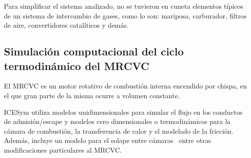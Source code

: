 Para simplificar el sistema analizado, no se tuvieron en cuneta elementos
típicos de un sistema de intercambio de gases, como lo son: mariposa,
carburador, filtros de aire, convertidores catalíticos y demás.


\subsection{Simulación computacional del ciclo termodinámico del MRCVC}

El MRCVC es un motor rotativo de combustión interna encendido por chispa, en el
que gran parte de la misma ocurre a volumen constante.

ICESym utiliza modelos unidimensionales para simular el flujo en los conductos
de admisión/escape y modelos cero dimensionales o termodinámicos para la cámara
de combustión, la transferencia de calor y el modelado de la fricción.
%
Además, incluye un modelo para el solape entre cámaras~\parencite{lopez16}
entre otras modificaciones particulares al MRCVC.\@
